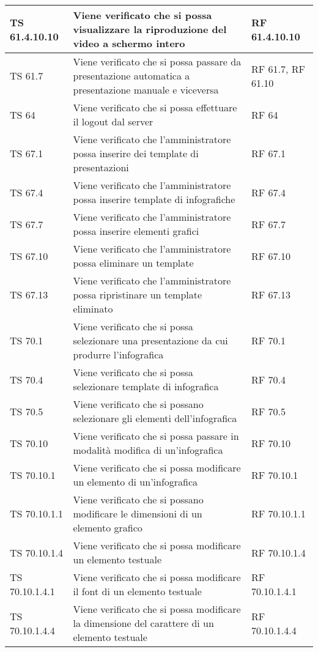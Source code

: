 {{\begin{longtable} [c]{| p{3cm} | p{6cm} |p{3cm}|}
			\hline
			TS 61.4.10.10 & Viene verificato che si possa visualizzare la riproduzione del video a schermo intero & RF 61.4.10.10\\
			\hline
			TS 61.7 & Viene verificato che si possa passare da presentazione automatica a presentazione manuale e viceversa & RF 61.7, RF 61.10\\
			\hline
			TS 64 & Viene verificato che si possa effettuare il logout\ped{g} dal server\ped{g} & RF 64\\
			\hline
			TS 67.1 & Viene verificato che l'amministratore possa inserire dei template\ped{g} di presentazioni & RF 67.1\\
			\hline
			TS 67.4 & Viene verificato che l'amministratore possa inserire template\ped{g} di infografiche\ped{g} & RF 67.4\\
			\hline
			TS 67.7 & Viene verificato che l'amministratore possa inserire elementi grafici & RF 67.7\\
			\hline
			TS 67.10 & Viene verificato che l'amministratore possa eliminare un template\ped{g} & RF 67.10\\
			\hline
			TS 67.13 & Viene verificato che l'amministratore possa ripristinare un template eliminato & RF 67.13\\
			\hline
			TS 70.1 & Viene verificato che si possa selezionare una presentazione da cui produrre l'infografica\ped{g}  & RF 70.1\\
			\hline
			TS 70.4 & Viene verificato che si possa selezionare template\ped{g} di infografica\ped{g} & RF 70.4\\
			\hline
			TS 70.5 & Viene verificato che si possano selezionare gli elementi dell'infografica  & RF 70.5\\
			\hline
			TS 70.10 & Viene verificato che si possa passare in modalità modifica di un'infografica\ped{g} & RF 70.10\\
			\hline
			TS 70.10.1 & Viene verificato che si possa modificare un elemento di un'infografica\ped{g} & RF 70.10.1\\
			\hline
			TS 70.10.1.1 & Viene verificato che si possano modificare le dimensioni di un elemento grafico & RF 70.10.1.1\\
			\hline
			TS 70.10.1.4 & Viene verificato che si possa modificare un elemento testuale  & RF 70.10.1.4\\
			\hline
			TS 70.10.1.4.1 & Viene verificato che si possa modificare il font\ped{g} di un elemento testuale & RF 70.10.1.4.1\\
			\hline
			TS 70.10.1.4.4 & Viene verificato che si possa modificare la dimensione del carattere di un elemento testuale & RF 70.10.1.4.4\\

\end{longtable}}}
